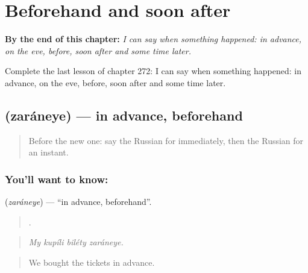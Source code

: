 
\chapter{Beforehand and soon after}
\label{ch:ru-beforehand-and-soon-after}

\begin{chapteropening}
\textbf{By the end of this chapter:} \emph{I can say when something happened: in advance, on the eve, before, soon after and some time later.}

Complete the last lesson of chapter 272: I can say when something happened: in advance, on the eve, before, soon after and some time later.
\end{chapteropening}

\section[\texorpdfstring{\ru{заранее} (zaráneye)}{заранее (zaráneye)}]{ (zaráneye) — in advance, beforehand}

\label{lesson:RU-C272-zaranee}



\begin{quote}
Before the new one: say the Russian for immediately, then the Russian for an instant.
\end{quote}

\subsection*{You'll want to know: }
\textbf{} (\emph{zaráneye}) — \textquotedblleft{}in advance, beforehand\textquotedblright{}.

\begin{quote}
   .
\end{quote}

\begin{quote}
\emph{My kupíli biléty zaráneye.}
\end{quote}

\begin{quote}
We bought the tickets in advance.
\end{quote}

